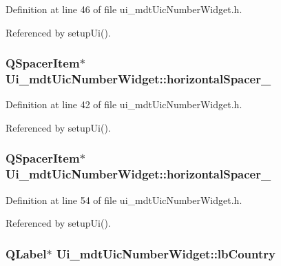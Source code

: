 Definition at line 46 of file ui\-\_\-mdt\-Uic\-Number\-Widget.\-h.



Referenced by setup\-Ui().

\hypertarget{class_ui__mdt_uic_number_widget_a8d6250a639700b3da08b83133b06b562}{
\subsubsection[{horizontal\-Spacer\-\_\-3}]{\setlength{\rightskip}{0pt plus 5cm}Q\-Spacer\-Item$\ast$ Ui\-\_\-mdt\-Uic\-Number\-Widget\-::horizontal\-Spacer\-\_}}\label{class_ui__mdt_uic_number_widget_a8d6250a639700b3da08b83133b06b562}


Definition at line 42 of file ui\-\_\-mdt\-Uic\-Number\-Widget.\-h.



Referenced by setup\-Ui().

\hypertarget{class_ui__mdt_uic_number_widget_a5cb47764864d494ac4ca71097aa5ebe1}{
\subsubsection[{horizontal\-Spacer\-\_\-4}]{\setlength{\rightskip}{0pt plus 5cm}Q\-Spacer\-Item$\ast$ Ui\-\_\-mdt\-Uic\-Number\-Widget\-::horizontal\-Spacer\-\_}}\label{class_ui__mdt_uic_number_widget_a5cb47764864d494ac4ca71097aa5ebe1}


Definition at line 54 of file ui\-\_\-mdt\-Uic\-Number\-Widget.\-h.



Referenced by setup\-Ui().

\hypertarget{class_ui__mdt_uic_number_widget_ac38fcaa4d27375706799fc1179d70317}{
\subsubsection[{lb\-Country}]{\setlength{\rightskip}{0pt plus 5cm}Q\-Label$\ast$ Ui\-\_\-mdt\-Uic\-Number\-Widget\-::lb\-Country}}\label{class_ui__mdt_uic_number_widget_ac38fcaa4d27375706799fc1179d70317}


